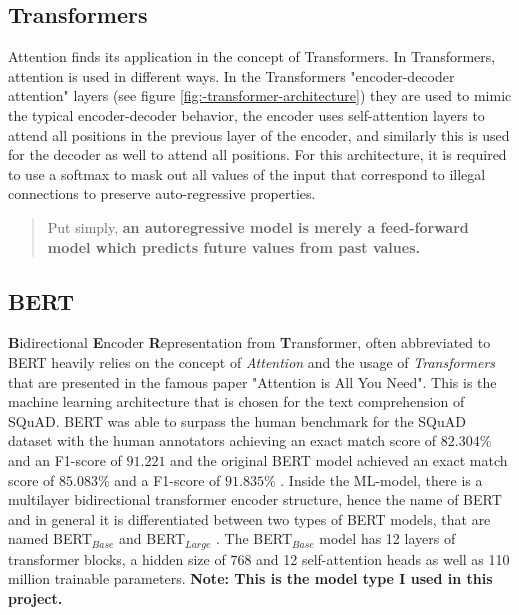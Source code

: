     \subsection{Transformers}
    \label{sec:-transformers}
    
        Attention finds its application in the concept of Transformers. 
        In Transformers, attention is used in different ways.
        In the Transformers "encoder-decoder attention" layers (see figure \ref{fig:-transformer-architecture}) they are used to mimic the typical encoder-decoder behavior, the encoder uses self-attention layers to attend all positions in the previous layer of the encoder, and similarly this is used for the decoder as well to attend all positions.
        For this architecture, it is required to use a softmax to mask out all values of the input that correspond to illegal connections to preserve auto-regressive properties.

        \begin{quote}
            Put simply, \textbf{an autoregressive model is merely a feed-forward model which predicts future values from past values.} \cite{autoregressiveGeorge}
        \end{quote}
    
    
    \subsection{BERT}
    \label{sec:-bert}

        \textbf{B}idirectional \textbf{E}ncoder \textbf{R}epresentation from \textbf{T}ransformer, often abbreviated to BERT heavily relies on the concept of \emph{Attention} and the usage of \emph{Transformers} that are presented in the famous paper "Attention is All You Need"\cite{vaswani2017attention}.
        This is the machine learning architecture that is chosen for the text comprehension of SQuAD.
        BERT was able to surpass the human benchmark for the SQuAD dataset with the human annotators achieving an exact match score of $82.304\%$ and an F1-score of $91.221$ and the original BERT model achieved an exact match score of $85.083\%$ and a F1-score of $91.835\%$ .
        Inside the ML-model, there is a multilayer bidirectional transformer encoder structure, hence the name of BERT and in general it is differentiated between two types of BERT models, that are named BERT$_{Base}$ and BERT$_{Large}$ \cite[Values taken from]{humanVSBert}.
        The BERT$_{Base}$ model has 12 layers of transformer blocks, a hidden size of $768$ and 12 self-attention heads as well as 110 million trainable parameters. \textbf{Note: This is the model type I used in this project.}

